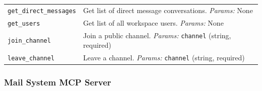 \documentclass{article}
\theoremstyle{plain}
\theoremstyle{definition}
\theoremstyle{remark}
\begin{document}
{\begin{longtable}{p{4.5cm} p{10cm}}
\texttt{get\_direct\_messages} & Get list of direct message conversations. \textit{Params:} None \\

\texttt{get\_users} & Get list of all workspace users. \textit{Params:} None \\

\texttt{join\_channel} & Join a public channel. \textit{Params:} \texttt{channel} (string, required) \\

\texttt{leave\_channel} & Leave a channel. \textit{Params:} \texttt{channel} (string, required) \\

\end{longtable}
}

\subsubsection{Mail System MCP Server}
\end{document}
